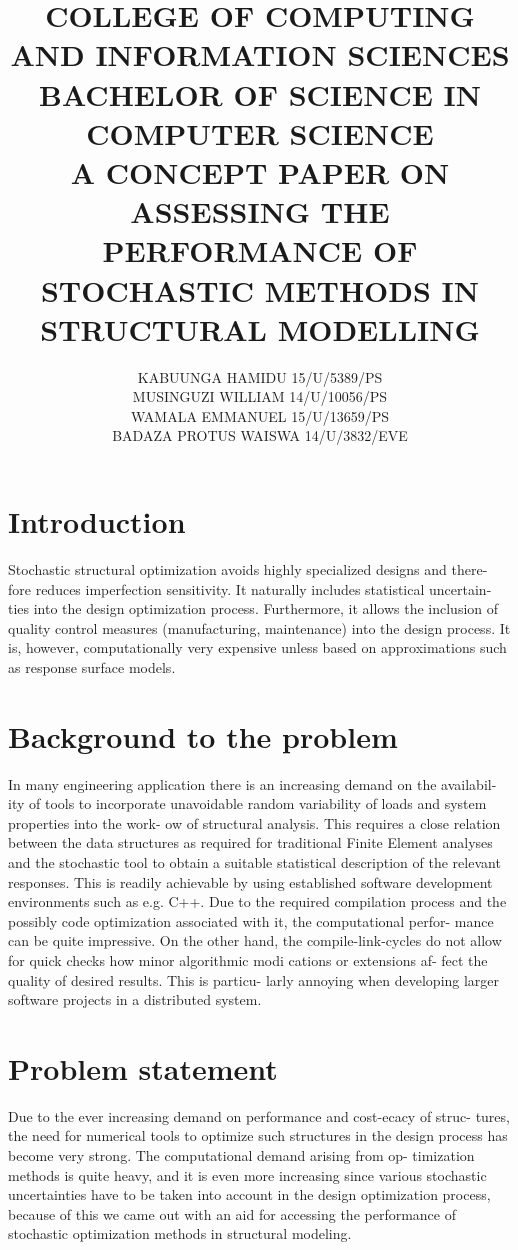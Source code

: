 \documentclass[12pt]{report}
\title{
{COLLEGE OF COMPUTING AND INFORMATION SCIENCES}\\
{\large BACHELOR OF SCIENCE IN COMPUTER SCIENCE}\\
{\Large \textbf{A CONCEPT PAPER ON ASSESSING THE PERFORMANCE OF STOCHASTIC METHODS IN STRUCTURAL MODELLING}}\\
}
\author{
{KABUUNGA HAMIDU 15/U/5389/PS}\\
{MUSINGUZI WILLIAM 14/U/10056/PS}\\
{WAMALA EMMANUEL 15/U/13659/PS}\\
{BADAZA PROTUS WAISWA 14/U/3832/EVE}
\textbf{}}
\begin{document}
\maketitle
\section{Introduction}
{Stochastic structural optimization avoids highly specialized designs and there-
	fore reduces imperfection sensitivity. It naturally includes statistical uncertain-
	ties into the design optimization process. Furthermore, it allows the inclusion of
	quality control measures (manufacturing, maintenance) into the design process.
	It is, however, computationally very expensive unless based on approximations
	such as response surface models.}
\section{Background to the problem}
{In many engineering application there is an increasing demand on the availabil-
	ity of tools to incorporate unavoidable random variability of loads and system
	properties into the work- ow of structural analysis. This requires a close relation
	between the data structures as required for traditional Finite Element analyses
	and the stochastic tool to obtain a suitable statistical description of the relevant
	responses. This is readily achievable by using established software development
	environments such as e.g. C++. Due to the required compilation process and
	the possibly code optimization associated with it, the computational perfor-
	mance can be quite impressive. On the other hand, the compile-link-cycles do
	not allow for quick checks how minor algorithmic modi
	cations or extensions af- fect the quality of desired results. This is particu-
	larly annoying when developing larger software projects in a distributed system.}
\section{Problem statement}
{Due to the ever increasing demand on performance and cost-ecacy of struc-
	tures, the need for numerical tools to optimize such structures in the design
	process has become very strong. The computational demand arising from op-
	timization methods is quite heavy, and it is even more increasing since various
	stochastic uncertainties have to be taken into account in the design optimization
	process, because of this we came out with an aid for accessing the performance
	of stochastic optimization methods in structural modeling.}
\end{document}
